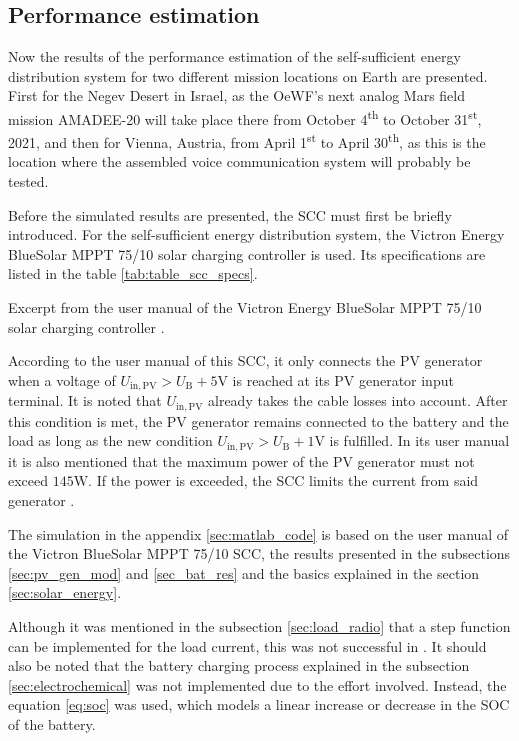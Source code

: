 \subsection{Performance estimation}
Now the results of the performance estimation of the self-sufficient energy distribution system for two different mission locations on Earth are presented. First for the Negev Desert in Israel, as the OeWF's next analog Mars field mission AMADEE-20 will take place there from October 4\textsuperscript{th} to October 31\textsuperscript{st}, 2021, and then for Vienna, Austria, from April 1\textsuperscript{st} to April 30\textsuperscript{th}, as this is the location where the assembled voice communication system will probably be tested.

Before the simulated results are presented, the SCC must first be briefly introduced. For the self-sufficient energy distribution system, the Victron Energy BlueSolar MPPT 75/10 solar charging controller is used. Its specifications are listed in the table \ref{tab:table_scc_specs}.
\begin{table}[h!]
	\centering
	
	\caption{Excerpt from the user manual of the Victron Energy BlueSolar MPPT 75/10 solar charging controller \cite{Victron:2021}.}
	\label{tab:table_scc_specs}
\end{table}
According to the user manual of this SCC, it only connects the PV generator when a voltage of $U_\mathrm{in,PV} > U_\mathrm{B} + 5\mathrm{V}$ is reached at its PV generator input terminal. It is noted that $U_\mathrm{in,PV}$ already takes the cable losses into account. After this condition is met, the PV generator remains connected to the battery and the load as long as the new condition $U_\mathrm{in,PV} > U_\mathrm{B} + 1\mathrm{V}$ is fulfilled. In its user manual it is also mentioned that the maximum power of the PV generator must not exceed $145\mathrm{W}$. If the power is exceeded, the SCC limits the current from said generator \cite{Victron:2021}.

The \MATLAB simulation in the appendix \ref{sec:matlab_code} is based on the user manual of the Victron BlueSolar MPPT 75/10 SCC, the results presented in the subsections \ref{sec:pv_gen_mod} and \ref{sec_bat_res} and the basics explained in the section \ref{sec:solar_energy}.

Although it was mentioned in the subsection \ref{sec:load_radio} that a step function can be implemented for the load current, this was not successful in \MATLAB. It should also be noted that the battery charging process explained in the subsection \ref{sec:electrochemical} was not implemented due to the effort involved. Instead, the equation \ref{eq:soc} was used, which models a linear increase or decrease in the SOC of the battery. 

